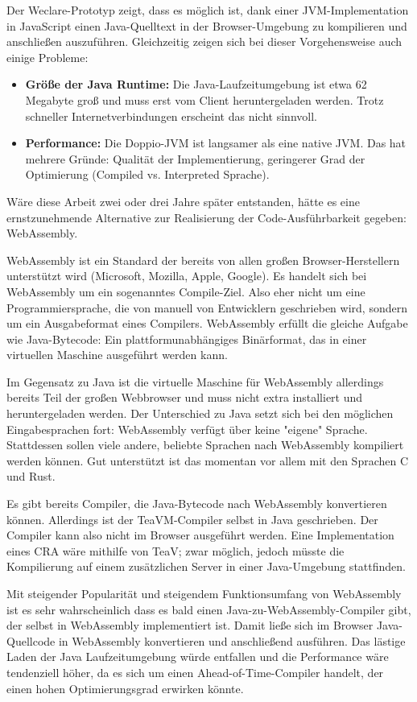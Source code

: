 Der Weclare-Prototyp zeigt, dass es möglich ist, dank einer JVM-Implementation in JavaScript einen Java-Quelltext in der Browser-Umgebung zu kompilieren und anschließen auszuführen. Gleichzeitig zeigen sich bei dieser Vorgehensweise auch einige Probleme:

\begin{itemize}
    \item \textbf{Größe der Java Runtime:} Die Java-Laufzeitumgebung ist etwa 62 Megabyte groß und muss erst vom Client heruntergeladen werden. Trotz schneller Internetverbindungen erscheint das nicht sinnvoll.
    \item \textbf{Performance:} Die Doppio-JVM ist langsamer als eine native JVM. Das hat mehrere Gründe: Qualität der Implementierung, geringerer Grad der Optimierung (Compiled vs. Interpreted Sprache).
\end{itemize}

Wäre diese Arbeit zwei oder drei Jahre später entstanden, hätte es eine ernstzunehmende Alternative zur Realisierung der Code-Ausführbarkeit gegeben: WebAssembly.

WebAssembly ist ein Standard der bereits von allen großen Browser-Herstellern unterstützt wird (Microsoft, Mozilla, Apple, Google). Es handelt sich bei WebAssembly um ein sogenanntes Compile-Ziel. Also eher nicht um eine Programmiersprache, die von manuell von Entwicklern geschrieben wird, sondern um ein Ausgabeformat eines Compilers. WebAssembly erfüllt die gleiche Aufgabe wie Java-Bytecode: Ein plattformunabhängiges Binärformat, das in einer virtuellen Maschine ausgeführt werden kann.

Im Gegensatz zu Java ist die virtuelle Maschine für WebAssembly allerdings bereits Teil der großen Webbrowser und muss nicht extra installiert und heruntergeladen werden. Der Unterschied zu Java setzt sich bei den möglichen Eingabesprachen fort: WebAssembly verfügt über keine "eigene" Sprache. Stattdessen sollen viele andere, beliebte Sprachen nach WebAssembly kompiliert werden können. Gut unterstützt ist das momentan vor allem mit den Sprachen C und Rust.

Es gibt bereits Compiler, die Java-Bytecode nach WebAssembly konvertieren können. Allerdings ist der TeaVM-Compiler selbst in Java geschrieben. Der Compiler kann also nicht im Browser ausgeführt werden. Eine Implementation eines CRA wäre mithilfe von TeaV; zwar möglich, jedoch müsste die Kompilierung auf einem zusätzlichen Server in einer Java-Umgebung stattfinden.

Mit steigender Popularität und steigendem Funktionsumfang von WebAssembly ist es sehr wahrscheinlich dass es bald einen Java-zu-WebAssembly-Compiler gibt, der selbst in WebAssembly implementiert ist. Damit ließe sich im Browser Java-Quellcode in WebAssembly konvertieren und anschließend ausführen. Das lästige Laden der Java Laufzeitumgebung würde entfallen und die Performance wäre tendenziell höher, da es sich um einen Ahead-of-Time-Compiler handelt, der einen hohen Optimierungsgrad erwirken könnte.